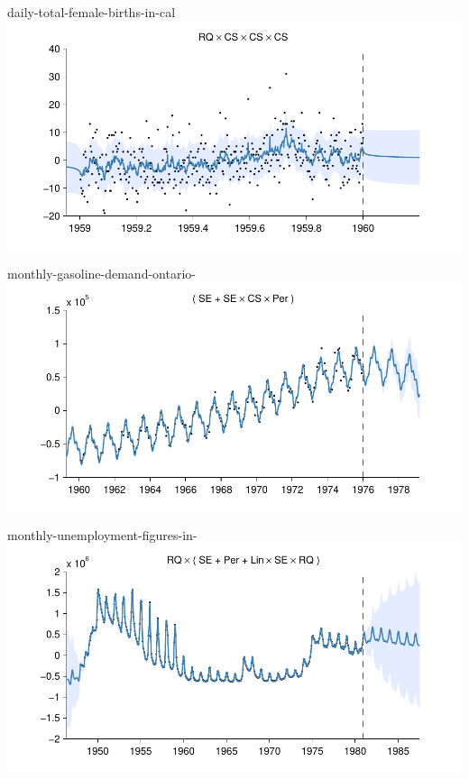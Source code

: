 \begin{frame}{daily-total-female-births-in-cal}
  \center
  \includegraphics[width=1.0\textwidth]{figures/daily-total-female-births-in-cal/daily-total-female-births-in-cal_all}
\end{frame} 

\begin{frame}{monthly-gasoline-demand-ontario-}
  \center
  \includegraphics[width=1.0\textwidth]{figures/monthly-gasoline-demand-ontario-/monthly-gasoline-demand-ontario-_all}
\end{frame}

\begin{frame}{monthly-unemployment-figures-in-}
  \center
  \includegraphics[width=1.0\textwidth]{figures/monthly-unemployment-figures-in-/monthly-unemployment-figures-in-_all}
\end{frame}  

